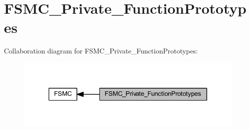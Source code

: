 \hypertarget{group___f_s_m_c___private___function_prototypes}{}\section{F\+S\+M\+C\+\_\+\+Private\+\_\+\+Function\+Prototypes}
\label{group___f_s_m_c___private___function_prototypes}
Collaboration diagram for F\+S\+M\+C\+\_\+\+Private\+\_\+\+Function\+Prototypes\+:
\nopagebreak
\begin{figure}[H]
\begin{center}
\leavevmode
\includegraphics[width=329pt]{group___f_s_m_c___private___function_prototypes}
\end{center}
\end{figure}
